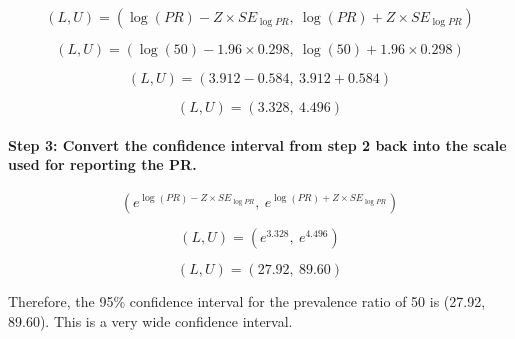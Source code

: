 \[
(L, U) = \left( \log(PR) - Z \times SE_{\log PR},\ \log(PR) + Z \times SE_{\log PR} \right)
\]

\[
(L, U) = \left( \log(50) - 1.96 \times 0.298,\ \log(50) + 1.96 \times 0.298 \right)
\]

\[
(L, U) = \left( 3.912 - 0.584,\ 3.912 + 0.584 \right)
\]

\[
(L, U) = \left( 3.328,\ 4.496 \right)
\]

\paragraph*{Step 3: Convert the confidence interval from step 2 back into the scale used for reporting the PR.}

\[
\left( e^{\log(PR) - Z \times SE_{\log PR}},\ e^{\log(PR) + Z \times SE_{\log PR}} \right)
\]

\[
(L, U) = \left( e^{3.328},\ e^{4.496} \right)
\]

\[
(L, U) = \left( 27.92,\ 89.60 \right)
\]

Therefore, the 95\% confidence interval for the prevalence ratio of 50 is (27.92, 89.60). This is a very wide confidence interval.

\newpage